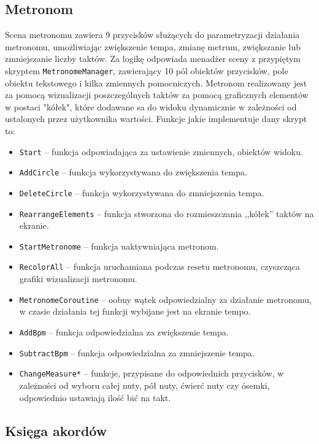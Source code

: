 \subsection{Metronom}
Scena metronomu zawiera 9 przycisków służących do parametryzacji działania metronomu, umożliwiając zwiększenie tempa, zmianę metrum, zwiększanie lub zmniejszanie liczby taktów. Za logikę odpowiada menadżer sceny z przypiętym skryptem \texttt{MetronomeManager}, zawierający 10 pól obiektów przycisków, pole obiektu tekstowego i kilka zmiennych pomocniczych. Metronom realizowany jest za pomocą wizualizacji poszczególnych taktów za pomocą graficznych elementów w postaci "kółek", które dodawane sa do widoku dynamicznie w zależności od ustalonych przez użytkownika wartości. Funkcje jakie implementuje dany skrypt to:

\begin{itemize}
    \item \texttt{Start} -- funkcja odpowiadająca za ustawienie zmiennych, obiektów widoku. 
    \item \texttt{AddCircle} -- funkcja wykorzystywana do zwiększenia tempa.
    \item \texttt{DeleteCircle} -- funkcja wykorzystywana do zmniejszenia tempa.
    \item \texttt{RearrangeElements} -- funkcja stworzona do rozmieszczania ,,kółek'' taktów na ekranie.
    \item \texttt{StartMetronome} -- funkcja uaktywniająca metronom.
    \item \texttt{RecolorAll} -- funkcja uruchamiana podczas resetu metronomu, czyszcząca grafiki wizualizacji metronomu.
    \item \texttt{MetronomeCoroutine} -- oobny wątek odpowiedzialny za działanie metronomu, w czasie działania tej funkcji wybijane jest na ekranie tempo.
    \item \texttt{AddBpm} -- funkcja odpowiedzialna za zwiększenie tempa.
    \item \texttt{SubtractBpm} -- funkcja odpowiedzialna za zmniejszenie tempa.
    \item \texttt{ChangeMeasure*} -- funkcje, przypisane do odpowiednich przycisków, w zależności od wyboru całej nuty, pół nuty, ćwierć nuty czy ósemki, odpowiednio ustawiają ilość bić na takt.
\end{itemize}
\subsection{Księga akordów}

